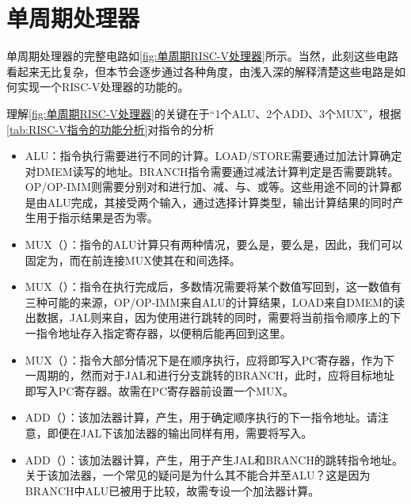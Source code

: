 \section{单周期处理器}

单周期处理器的完整电路如\cref{fig:单周期RISC-V处理器}所示。当然，此刻这些电路看起来无比复杂，但本节会逐步通过各种角度，由浅入深的解释清楚这些电路是如何实现一个RISC-V处理器的功能的。

理解\cref{fig:单周期RISC-V处理器}的关键在于“1个ALU、2个ADD、3个MUX”，根据\cref{tab:RISC-V指令的功能分析}对指令的分析
\begin{itemize}
    \item ALU：指令执行需要进行不同的计算。LOAD/STORE需要通过加法计算确定对DMEM读写的地址。BRANCH指令需要通过减法计算判定是否需要跳转。OP/OP-IMM则需要分别对和进行加、减、与、或等。这些用途不同的计算都是由ALU完成，其接受两个输入，通过选择计算类型，输出计算结果的同时产生用于指示结果是否为零。
    \item MUX（）：指令的ALU计算只有两种情况，要么是，要么是，因此，我们可以固定为，而在前连接MUX使其在和间选择。
    \item MUX（）：指令在执行完成后，多数情况需要将某个数值写回到，这一数值有三种可能的来源，OP/OP-IMM来自ALU的计算结果，LOAD来自DMEM的读出数据，JAL则来自，因为使用进行跳转的同时，需要将当前指令顺序上的下一指令地址存入指定寄存器，以便稍后能再回到这里。
    \item MUX（）：指令大部分情况下是在顺序执行，应将即写入PC寄存器，作为下一周期的，然而对于JAL和进行分支跳转的BRANCH，此时，应将目标地址即写入PC寄存器。故需在PC寄存器前设置一个MUX。
    \item ADD（）：该加法器计算，产生，用于确定顺序执行的下一指令地址。请注意，即便在JAL下该加法器的输出同样有用，需要将写入。
    \item ADD（）：该加法器计算，产生，用于产生JAL和BRANCH的跳转指令地址。关于该加法器，一个常见的疑问是为什么其不能合并至ALU？这是因为BRANCH中ALU已被用于比较，故需专设一个加法器计算。
\end{itemize}

